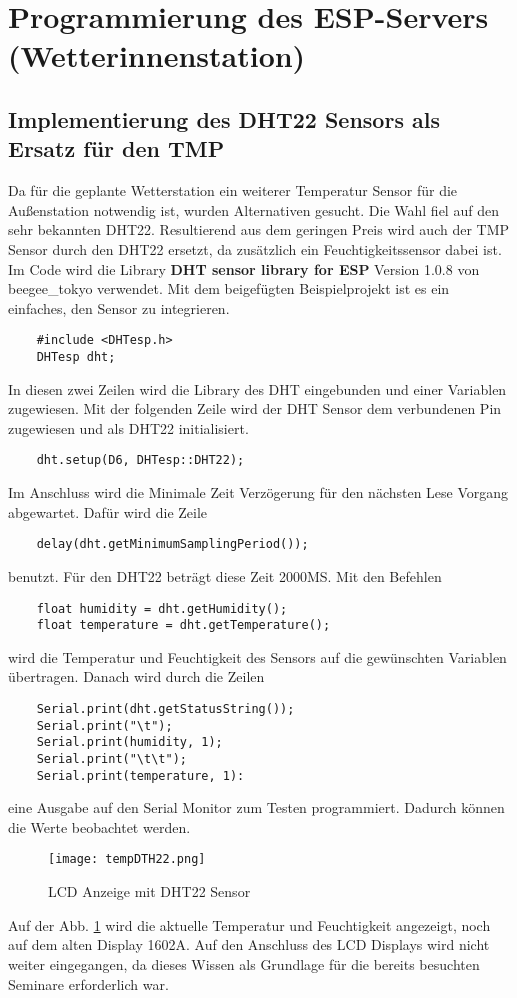 \documentclass[12pt,a4paper]{scrartcl}	%
\begin{document}
\section{Programmierung des ESP-Servers (Wetterinnenstation)}
\subsection{Implementierung des DHT22 Sensors als Ersatz für den TMP}
Da für die geplante Wetterstation ein weiterer Temperatur Sensor für die Außenstation notwendig ist, wurden Alternativen gesucht. Die Wahl fiel auf den sehr bekannten DHT22. Resultierend aus dem geringen Preis wird auch der TMP Sensor durch den DHT22 ersetzt, da zusätzlich ein Feuchtigkeitssensor dabei ist.\\
Im Code wird die Library \textbf{DHT sensor library for ESP} Version 1.0.8 von beegee\_tokyo verwendet.
Mit dem beigefügten Beispielprojekt ist es ein einfaches, den Sensor zu integrieren.
\begin{lstlisting}
	#include <DHTesp.h>
	DHTesp dht;
\end{lstlisting}
In diesen zwei Zeilen wird die Library des DHT eingebunden und einer Variablen zugewiesen. Mit der folgenden Zeile wird der DHT Sensor dem verbundenen Pin zugewiesen und als DHT22 initialisiert.
\begin{lstlisting}
	dht.setup(D6, DHTesp::DHT22); 
\end{lstlisting}
Im Anschluss wird die Minimale Zeit Verzögerung für den nächsten Lese Vorgang abgewartet. Dafür wird die Zeile 
\begin{lstlisting}
	delay(dht.getMinimumSamplingPeriod());
\end{lstlisting}
benutzt. Für den DHT22 beträgt diese Zeit 2000MS. Mit den Befehlen 
\begin{lstlisting}
	float humidity = dht.getHumidity();
	float temperature = dht.getTemperature();
\end{lstlisting}
wird die Temperatur und Feuchtigkeit des Sensors auf die gewünschten Variablen übertragen. Danach wird durch die Zeilen 
\begin{lstlisting}
	Serial.print(dht.getStatusString());
	Serial.print("\t");
	Serial.print(humidity, 1);
	Serial.print("\t\t");
	Serial.print(temperature, 1):
\end{lstlisting}
eine Ausgabe auf den Serial Monitor zum Testen programmiert. Dadurch können die Werte beobachtet werden. 
\begin{figure}[htb]
	\centering
	\texttt{[image: tempDTH22.png]}
	\caption{LCD Anzeige mit DHT22 Sensor}
	\label{tempdht22}
\end{figure}
Auf der Abb. \ref{tempdht22} wird die aktuelle Temperatur und Feuchtigkeit angezeigt, noch auf dem alten Display 1602A. Auf den Anschluss des LCD Displays wird nicht weiter eingegangen, da dieses Wissen als Grundlage für die bereits besuchten Seminare erforderlich war.\\
\end{document}
